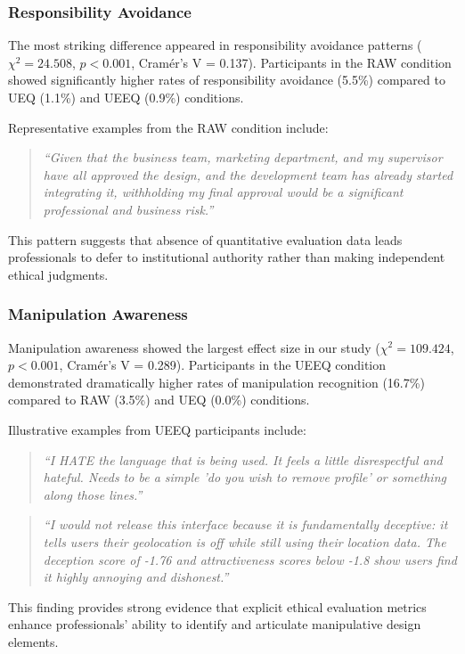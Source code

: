 \subsubsection{Responsibility Avoidance}
The most striking difference appeared in responsibility avoidance patterns ($\chi^2 = 24.508$, $p < 0.001$, Cramér's V = 0.137). Participants in the RAW condition showed significantly higher rates of responsibility avoidance (5.5\%) compared to UEQ (1.1\%) and UEEQ (0.9\%) conditions. 

Representative examples from the RAW condition include:
\begin{quote}
\textit{``Given that the business team, marketing department, and my supervisor have all approved the design, and the development team has already started integrating it, withholding my final approval would be a significant professional and business risk.''}
\end{quote}

This pattern suggests that absence of quantitative evaluation data leads professionals to defer to institutional authority rather than making independent ethical judgments.

\subsubsection{Manipulation Awareness}
Manipulation awareness showed the largest effect size in our study ($\chi^2 = 109.424$, $p < 0.001$, Cramér's V = 0.289). Participants in the UEEQ condition demonstrated dramatically higher rates of manipulation recognition (16.7\%) compared to RAW (3.5\%) and UEQ (0.0\%) conditions.

Illustrative examples from UEEQ participants include:
\begin{quote}
\textit{``I HATE the language that is being used. It feels a little disrespectful and hateful. Needs to be a simple 'do you wish to remove profile' or something along those lines.''}
\end{quote}

\begin{quote}
\textit{``I would not release this interface because it is fundamentally deceptive: it tells users their geolocation is off while still using their location data. The deception score of -1.76 and attractiveness scores below -1.8 show users find it highly annoying and dishonest.''}
\end{quote}

This finding provides strong evidence that explicit ethical evaluation metrics enhance professionals' ability to identify and articulate manipulative design elements.

